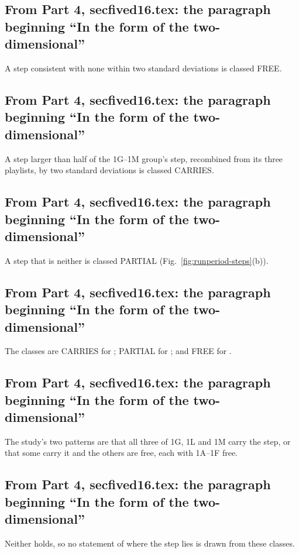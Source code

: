 \subsection{From Part 4, secfived16.tex: the paragraph beginning ``In the form of the two-dimensional''}
A step consistent with none within two standard deviations is classed FREE.

\subsection{From Part 4, secfived16.tex: the paragraph beginning ``In the form of the two-dimensional''}
A step larger than half of the 1G--1M group's step, recombined from its three playlists, by two standard deviations is classed CARRIES.

\subsection{From Part 4, secfived16.tex: the paragraph beginning ``In the form of the two-dimensional''}
A step that is neither is classed PARTIAL (Fig.~\ref{fig:runperiod-steps}(b)).

\subsection{From Part 4, secfived16.tex: the paragraph beginning ``In the form of the two-dimensional''}
The classes are CARRIES for ; PARTIAL for ; and FREE for .

\subsection{From Part 4, secfived16.tex: the paragraph beginning ``In the form of the two-dimensional''}
The study's two patterns are that all three of 1G, 1L and 1M carry the step, or that some carry it and the others are free, each with 1A--1F free.

\subsection{From Part 4, secfived16.tex: the paragraph beginning ``In the form of the two-dimensional''}
Neither holds, so no statement of where the step lies is drawn from these classes.

